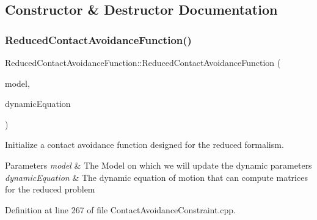 \subsection{Constructor \& Destructor Documentation}
\hypertarget{classocra_1_1ReducedContactAvoidanceFunction_ae2183d53a13985590ee4f5cf59083803}{}\label{classocra_1_1ReducedContactAvoidanceFunction_ae2183d53a13985590ee4f5cf59083803} 
\subsubsection{\texorpdfstring{Reduced\+Contact\+Avoidance\+Function()}{ReducedContactAvoidanceFunction()}}
{\footnotesize\ttfamily Reduced\+Contact\+Avoidance\+Function\+::\+Reduced\+Contact\+Avoidance\+Function (\begin{DoxyParamCaption}\item[{const Model \&}]{model,  }\item[{const \hyperlink{classocra_1_1FullDynamicEquationFunction}{Full\+Dynamic\+Equation\+Function} \&}]{dynamic\+Equation }\end{DoxyParamCaption})}

Initialize a contact avoidance function designed for the reduced formalism.


\begin{DoxyParams}{Parameters}
{\em model} & The Model on which we will update the dynamic parameters \\
\hline
{\em dynamic\+Equation} & The dynamic equation of motion that can compute matrices for the reduced problem \\
\hline
\end{DoxyParams}


Definition at line 267 of file Contact\+Avoidance\+Constraint.\+cpp.

\hypertarget{classocra_1_1ReducedContactAvoidanceFunction_a7a1844143947f714f2e0207d9f56834a}{}\label{classocra_1_1ReducedContactAvoidanceFunction_a7a1844143947f714f2e0207d9f56834a} 
